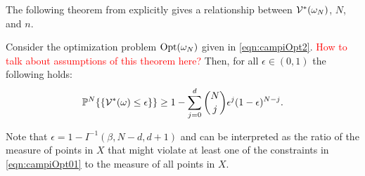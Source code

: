 The following theorem from \cite{campi} explicitly gives a relationship between $\mathcal{V}^*(\omega_N)$, $N$, and $n$.
\begin{theorem}\label{thm:campi}Consider the optimization problem $\text{Opt}(\omega_N)$ given in \eqref{eqn:campiOpt2}. \textcolor{red}{How to talk about assumptions of this theorem here?} Then, for all $\epsilon \in (0,1)$ the following holds:
\begin{equation*}\mathbb{P}^N\{\{\mathcal{V}^*(\omega) \leq \epsilon\} \} \geq 1- \sum_{j=0}^{d} \binom{N}{j}\epsilon^j (1-\epsilon)^{N-j}.\end{equation*}
\end{theorem}
Note that $\epsilon=1-I^{-1}(\beta, N-d, d+1)$ and can be interpreted as the ratio of the measure of points in $X$ that might violate at least one of the constraints in \eqref{eqn:campiOpt01} to the measure of all points in $X$.

%






%
%

